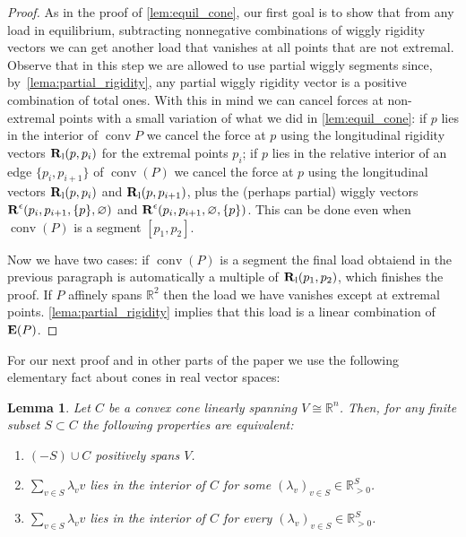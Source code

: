 \documentclass{amsart}
\newtheorem{lemma}[theorem]{Lemma}
\theoremstyle{definition}
\newcommand{\R}{\mathbb{R}} %
\renewcommand{\b}[1]{{\boldsymbol{#1}}} %
\DeclareMathOperator{\conv}{conv} %
\newcommand{\paco}[1]{\todo[size=\scriptsize, color=orange!30]{\rm #1 \\ \hfill --- P.}}
\newcommand{\Rvector}{\b{\rm R}} %
\newcommand{\lon}{\operatorname{l}} %
\newcommand{\Rlong}{\Rvector_{\lon}} %
\newcommand{\Reps}{\Rvector^\epsilon} %
\newcommand{\Ematrix}{\b{\rm E}} %
\begin{document}
\begin{proof}
As in the proof of \cref{lem:equil_cone}, our first goal is to show that from any load in equilibrium, subtracting nonnegative combinations of wiggly rigidity vectors we can get another load that vanishes at all points that are not extremal. 
Observe that in this step we are allowed to use partial wiggly segments since, by~\cref{lema:partial_rigidity}, any partial wiggly rigidity vector is a positive combination of total ones. 
With this in mind we can cancel forces at non-extremal points with a small variation of what we did in \cref{lem:equil_cone}: 
if $p$ lies in the interior of $\conv{P}$ we cancel the force at $p$ using the longitudinal rigidity vectors $\Rlong(p,p_i)$ for the extremal points $p_i$; 
if $p$ lies in the relative interior of an edge $\{p_i,p_{i+1}\}$ of $\conv(P)$ we cancel the force at $p$ using the longitudinal vectors $\Rlong(p,p_i)$ and $\Rlong(p,p_{i+1})$, plus the (perhaps partial) wiggly vectors $\Reps(p_i,p_{i+1}, \{p\},\varnothing)$ and $\Reps(p_i,p_{i+1},\varnothing,  \{p\})$. 
This can be done even when $\conv(P)$ is a segment $[p_1,p_2]$. 

Now we have two cases: if  $\conv(P)$ is a segment the final load obtaiend in the previous paragraph is automatically a multiple of $\Rlong(p_1,p_2)$, which finishes the proof. If $P$ affinely spans $\R^2$ then the load we have vanishes except at extremal points. \cref{lema:partial_rigidity} implies that this load is a linear combination of  $\Ematrix(P)$.
\end{proof}

For our next proof and in other parts of the paper we use the following elementary fact about cones in real vector spaces:

\begin{lemma}
\label{lemma:spanning}
\paco{does this need a proof?}
Let $C$ be a convex cone linearly spanning $V\cong \R^n$. Then, for any finite subset $S\subset C$ the following properties are equivalent: 
\begin{enumerate}
\item $(-S)\cup C$ positively spans $V$.
\item $\sum_{v\in S} \lambda_v v$ lies in the interior of $C$ for some $(\lambda_v)_{v\in S} \in \R_{>0}^S$.
\item $\sum_{v\in S} \lambda_v v$ lies in the interior of $C$ for every $(\lambda_v)_{v\in S} \in \R_{>0}^S$.
\end{enumerate}
\end{lemma}
\end{document}
